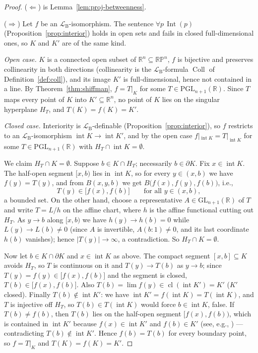 \documentclass[11pt]{amsart}
\theoremstyle{definition}
\newcommand{\R}{\mathbb{R}}
\newcommand{\RP}{\mathbb{RP}}
\newcommand{\LB}{\mathcal{L}_{\mathrm{B}}}
\newcommand{\Int}{\operatorname{Int}}
\newcommand{\Coll}{\operatorname{Coll}}
\newcommand{\interior}{\operatorname{int}}
\newcommand{\cl}{\operatorname{cl}}
\newcommand{\PGL}{\mathrm{PGL}}
\newcommand{\GL}{\mathrm{GL}}
\begin{document}
\begin{proof}
($\Leftarrow$) is Lemma~\ref{lem:proj-betweenness}.

($\Rightarrow$) Let $f$ be an $\LB$-isomorphism. The sentence
$\forall p\,\Int(p)$ (Proposition~\ref{prop:interior}) holds in open sets and
fails in closed full-dimensional ones, so $K$ and $K'$ are of the same kind.

\emph{Open case.} $K$ is a connected open subset of $\R^n\subseteq\RP^n$,
$f$ is bijective and preserves collinearity in both directions (collinearity
is the $\LB$-formula $\Coll$ of Definition~\ref{def:coll}), and its image
$K'$ is full-dimensional, hence not contained in a line. By
Theorem~\ref{thm:shiffman}, $f=T|_K$ for some $T\in\PGL_{n+1}(\R)$. Since $T$
maps every point of $K$ into $K'\subseteq\R^n$, no point of $K$ lies on the
singular hyperplane $H_T$, and $T(K)=f(K)=K'$.

\emph{Closed case.} Interiority is $\LB$-definable
(Proposition~\ref{prop:interior}), so $f$ restricts to an $\LB$-isomorphism
$\interior K\to\interior K'$, and by the open case
$f|_{\interior K}=T|_{\interior K}$ for some $T\in\PGL_{n+1}(\R)$ with
$H_T\cap\interior K=\emptyset$.

We claim $H_T\cap K=\emptyset$. Suppose $b\in K\cap H_T$; necessarily
$b\in\partial K$. Fix $x\in\interior K$. The half-open segment
$[x,b)$ lies in $\interior K$, so for every $y\in(x,b)$ we have
$f(y)=T(y)$, and from $B(x,y,b)$ we get $B\bigl(f(x),f(y),f(b)\bigr)$, i.e.,
\[
T(y)\in\bigl[f(x),f(b)\bigr]\qquad\text{for all }y\in(x,b),
\]
a bounded set. On the other hand, choose a representative
$A\in\GL_{n+1}(\R)$ of $T$ and write $T=L/h$ on the affine chart, where $h$
is the affine functional cutting out $H_T$. As $y\to b$ along $[x,b)$ we have
$h(y)\to h(b)=0$ while $L(y)\to L(b)\ne0$ (since $A$ is invertible,
$A(b{:}1)\ne0$, and its last coordinate $h(b)$ vanishes); hence
$|T(y)|\to\infty$, a contradiction. So $H_T\cap K=\emptyset$.

Now let $b\in K\cap\partial K$ and $x\in\interior K$ as above. The compact
segment $[x,b]\subseteq K$ avoids $H_T$, so $T$ is continuous on it and
$T(y)\to T(b)$ as $y\to b$; since $T(y)=f(y)\in\bigl[f(x),f(b)\bigr]$ and the
segment is closed, $T(b)\in\bigl[f(x),f(b)\bigr]$. Also
$T(b)=\lim f(y)\in\cl(\interior K')=K'$ ($K'$ closed). Finally
$T(b)\notin\interior K'$: we have $\interior K'=f(\interior K)=
T(\interior K)$, and $T$ is injective off $H_T$, so $T(b)\in T(\interior K)$
would force $b\in\interior K$, false. If $T(b)\ne f(b)$, then $T(b)$ lies on
the half-open segment $\bigl[f(x),f(b)\bigr)$, which is contained in
$\interior K'$ because $f(x)\in\interior K'$ and $f(b)\in K'$ (see, e.g.,
\cite[Lemma~1.1.9]{Schneider14}) --- contradicting
$T(b)\notin\interior K'$. Hence $f(b)=T(b)$ for every boundary point, so
$f=T|_K$ and $T(K)=f(K)=K'$.
\end{proof}
\end{document}
